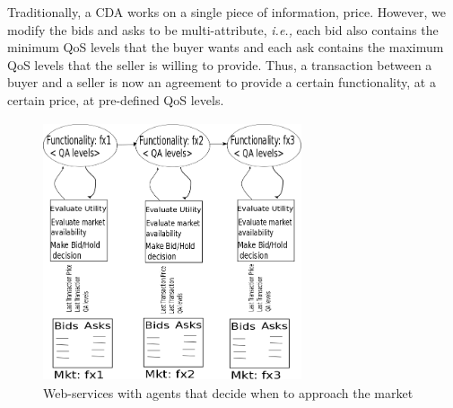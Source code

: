 \documentclass[10pt,journal,compsoc]{IEEEtran}
\begin{document}
Traditionally, a CDA works on a single piece of information, price. However, we modify the bids and asks to be multi-attribute, \textit{i.e.,} each bid also contains the minimum QoS levels that the buyer wants and each ask contains the maximum QoS levels that the seller is willing to provide. Thus, a transaction between a buyer and a seller is now an agreement to provide a certain functionality, at a certain price, at pre-defined QoS levels.

\begin{figure} 
    \centering
    \includegraphics[width=3in, height=3in]{drawings/buyers-and-market.png}
  \caption{Web-services with agents that decide when to approach the market}
 \label{marketplace}
 \end{figure}
 
\end{document}
